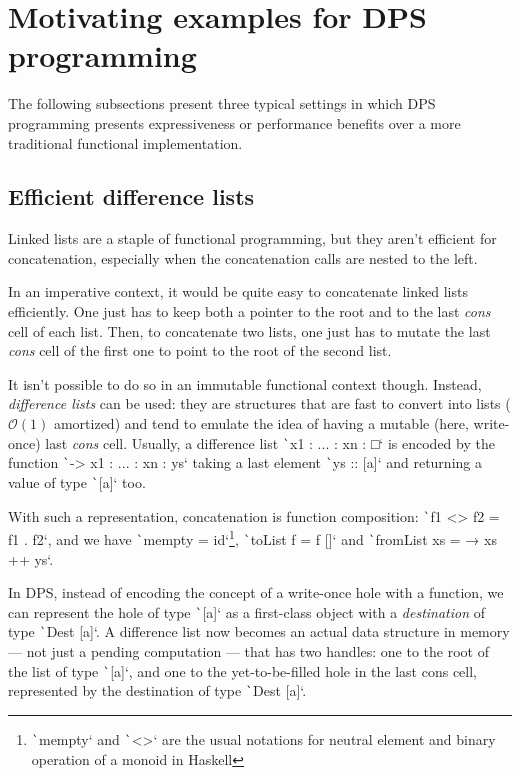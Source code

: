\documentclass[english]{jflart}
\begin{document}
\section{Motivating examples for DPS programming}\label{sec:motivating-examples}

The following subsections present three typical settings in which DPS programming presents expressiveness or performance benefits over a more traditional functional implementation.

\subsection{Efficient difference lists}\label{ssec:dlist}

Linked lists are a staple of functional programming, but they aren't efficient for concatenation, especially when the concatenation calls are nested to the left.

In an imperative context, it would be quite easy to concatenate linked lists efficiently. One just has to keep both a pointer to the root and to the last \emph{cons} cell of each list. Then, to concatenate two lists, one just has to mutate the last \emph{cons} cell of the first one to point to the root of the second list.

It isn't possible to do so in an immutable functional context though. Instead, \emph{difference lists} can be used: they are structures that are fast to convert into lists ($\mathcal{O}(1)$ amortized) and tend to emulate the idea of having a mutable (here, write-once) last \emph{cons} cell. Usually, a difference list \texttt`x1 : ... : xn : □` is encoded by the function \texttt`\ys -> x1 : ... : xn : ys` taking a last element \texttt`ys :: [a]` and returning a value of type \texttt`[a]` too.

With such a representation, concatenation is function composition: \texttt`f1 <> f2 = f1 . f2`, and we have \texttt`mempty = id`\footnote{\texttt`mempty` and \texttt`<>` are the usual notations for neutral element and binary operation of a monoid in Haskell}, \texttt`toList f = f []` and \texttt`fromList xs = \ys → xs ++ ys`.

In DPS, instead of encoding the concept of a write-once hole with a function, we can represent the hole of type \texttt`[a]` as a first-class object with a \emph{destination} of type \texttt`Dest [a]`. A difference list now becomes an actual data structure in memory --- not just a pending computation --- that has two handles: one to the root of the list of type \texttt`[a]`, and one to the yet-to-be-filled hole in the last cons cell, represented by the destination of type \texttt`Dest [a]`.
\end{document}
